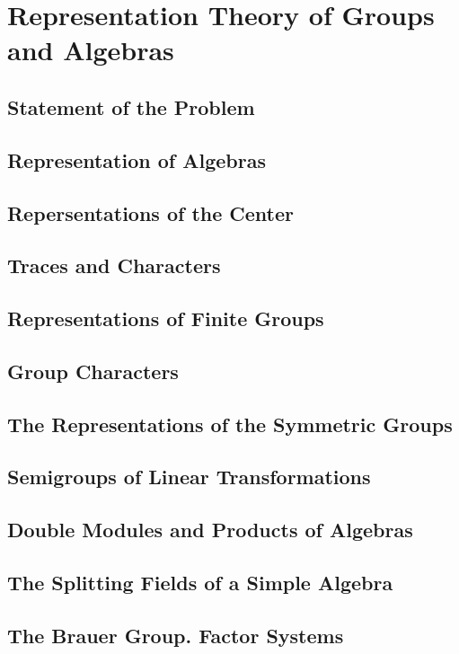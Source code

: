 \section{Representation Theory of Groups and Algebras}

\subsection{Statement of the Problem}

\subsection{Representation of Algebras}

\subsection{Repersentations of the Center}

\subsection{Traces and Characters}

\subsection{Representations of Finite Groups}

\subsection{Group Characters}

\subsection{The Representations of the Symmetric Groups}

\subsection{Semigroups of Linear Transformations}

\subsection{Double Modules and Products of Algebras}

\subsection{The Splitting Fields of a Simple Algebra}

\subsection{The Brauer Group. Factor Systems}